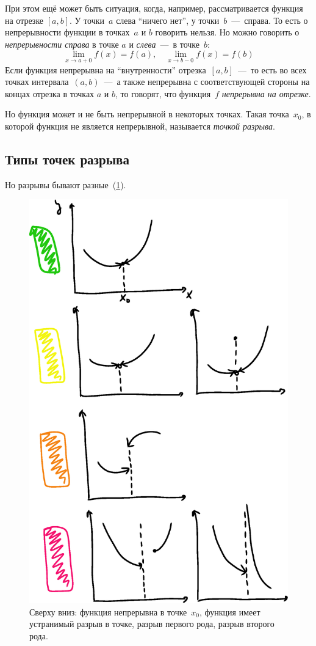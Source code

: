 \documentclass[a4paper,12pt]{article}
\begin{document}
  При этом ещё может быть ситуация, когда, например, рассматривается функция на отрезке $[a, b]$.
  У точки~$a$ слева ``ничего нет'', у точки~$b$~---~справа.
  То есть о непрерывности функции в точках~$a$ и $b$ говорить нельзя.
  Но можно говорить о \emph{непрерывности справа} в точке $a$ и \emph{слева}~---~в точке~$b$:
  \[
    \lim_{x \to a + 0} f(x) = f(a),\quad \lim_{x \to b - 0} f(x) = f(b)
  \]
  Если функция непрерывна на ``внутренности'' отрезка~$[a, b]$~---~то есть во всех точках интервала~$(a, b)$~---~а также непрерывна с соответствующей стороны на концах отрезка в точках $a$ и $b$, то говорят, что функция~$f$ \emph{непрерывна на отрезке}.

  Но функция может и не быть непрерывной в некоторых точках.
  Такая точка~$x_0$, в которой функция не является непрерывной, называется \emph{точкой разрыва}.
  
  \subsection{Типы точек разрыва}
  Но разрывы бывают разные~(\ref{fig:bad-guys}).
    
  \begin{figure}[ht]
    \centering
    \includegraphics[width=0.6\linewidth]{images/bad-guys}
    
    \caption{
      Сверху вниз: функция непрерывна в точке~$x_0$, функция имеет устранимый разрыв в точке, разрыв первого рода, разрыв второго рода.
    }
    \label{fig:bad-guys}
  \end{figure}
\end{document}
